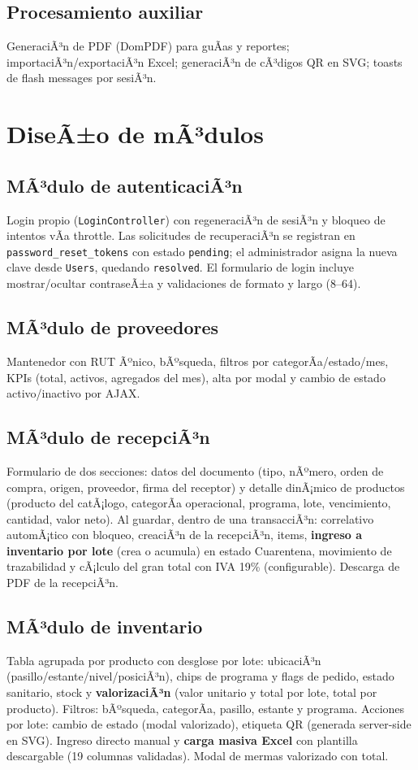 ﻿\documentclass[a4paper, 12pt]{article}
\begin{document}
\subsection{Procesamiento auxiliar}
GeneraciÃ³n de PDF (DomPDF) para guÃ­as y reportes; importaciÃ³n/exportaciÃ³n Excel; generaciÃ³n de cÃ³digos QR en SVG; toasts de flash messages por sesiÃ³n.

\section{DiseÃ±o de mÃ³dulos}

\subsection{MÃ³dulo de autenticaciÃ³n}
Login propio (\texttt{LoginController}) con regeneraciÃ³n de sesiÃ³n y bloqueo de intentos vÃ­a throttle. Las solicitudes de recuperaciÃ³n se registran en \texttt{password\_reset\_tokens} con estado \texttt{pending}; el administrador asigna la nueva clave desde \texttt{Users}, quedando \texttt{resolved}. El formulario de login incluye mostrar/ocultar contraseÃ±a y validaciones de formato y largo (8--64).

\subsection{MÃ³dulo de proveedores}
Mantenedor con RUT Ãºnico, bÃºsqueda, filtros por categorÃ­a/estado/mes, KPIs (total, activos, agregados del mes), alta por modal y cambio de estado activo/inactivo por AJAX.

\subsection{MÃ³dulo de recepciÃ³n}
Formulario de dos secciones: datos del documento (tipo, nÃºmero, orden de compra, origen, proveedor, firma del receptor) y detalle dinÃ¡mico de productos (producto del catÃ¡logo, categorÃ­a operacional, programa, lote, vencimiento, cantidad, valor neto). Al guardar, dentro de una transacciÃ³n: correlativo automÃ¡tico con bloqueo, creaciÃ³n de la recepciÃ³n, items, \textbf{ingreso a inventario por lote} (crea o acumula) en estado Cuarentena, movimiento de trazabilidad y cÃ¡lculo del gran total con IVA 19\% (configurable). Descarga de PDF de la recepciÃ³n.

\subsection{MÃ³dulo de inventario}
Tabla agrupada por producto con desglose por lote: ubicaciÃ³n (pasillo/estante/nivel/posiciÃ³n), chips de programa y flags de pedido, estado sanitario, stock y \textbf{valorizaciÃ³n} (valor unitario y total por lote, total por producto). Filtros: bÃºsqueda, categorÃ­a, pasillo, estante y programa. Acciones por lote: cambio de estado (modal valorizado), etiqueta QR (generada server-side en SVG). Ingreso directo manual y \textbf{carga masiva Excel} con plantilla descargable (19 columnas validadas). Modal de mermas valorizado con total.
\end{document}
